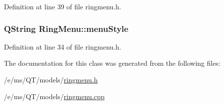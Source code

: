 Definition at line 39 of file ringmenu.h.

\hypertarget{classRingMenu_af5694ea5c7af1ded9aedfbb44eaff454}{
\subsubsection[{menuStyle}]{\setlength{\rightskip}{0pt plus 5cm}QString RingMenu::menuStyle}}
\label{classRingMenu_af5694ea5c7af1ded9aedfbb44eaff454}


Definition at line 34 of file ringmenu.h.



The documentation for this class was generated from the following files:\begin{DoxyCompactItemize}
\item 
/e/ms/QT/models/\hyperlink{ringmenu_8h}{ringmenu.h}\item 
/e/ms/QT/models/\hyperlink{ringmenu_8cpp}{ringmenu.cpp}\end{DoxyCompactItemize}
